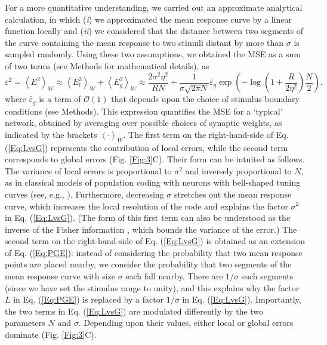 \documentclass[a4paper]{article}%
\begin{document}
For a more quantitative understanding, we carried out an approximate
analytical calculation, in which (\textit{i}) we approximated the mean
response curve by a linear function locally and (\textit{ii}) we considered
that the distance between two segments of the curve containing the mean
response to two stimuli distant by more than $\sigma$ is sampled randomly.
Using these two assumptions, we obtained the MSE as a sum of two terms (see
Methods for mathematical details), as
\begin{equation}
\varepsilon^{2}=\left\langle E^{2}\right\rangle _{W}\approx\left\langle
E_{l}^{2}\right\rangle _{W}+\left\langle E_{g}^{2}\right\rangle _{W}%
\approx\frac{2\sigma^{2}\eta^{2}}{RN}+\frac{1}{\sigma\sqrt{2\pi N}}%
\bar{\varepsilon}_{g}\exp\left(  {-\log}\left(  {1+\frac{R}{2\eta^{2}}%
}\right)  \frac{N}{2}\right)  , \label{Eq:LvsG}%
\end{equation}
where $\bar{\varepsilon}_{g}$ is a term of $\mathcal{O}\left(  1\right)  $
that depends upon the choice of stimulus boundary conditions (see Methods).
This expression quantifies the MSE for a `typical' network, obtained by
averaging over possible choices of synaptic weights, as indicated by the
brackets $\left\langle \cdot\right\rangle _{W}$. The first term on the
right-hand-side of Eq. (\ref{Eq:LvsG}) represents the contribution of local
errors, while the second term corresponds to global errors (Fig.
\ref{Fig:3}C). Their form can be intuited as follows. The variance of local
errors is proportional to $\sigma^{2}$ and inversely proportional to $N$, as
in classical models of population coding with neurons with bell-shaped tuning
curves (see, e.g., \cite{Dayan2001TheoreticalSystems}). Furthermore,
decreasing $\sigma$ stretches out the mean response curve, which increases the
local resolution of the code and explains the factor $\sigma^{2}$ in Eq.
(\ref{Eq:LvsG}). (The form of this first term can also be understood as the
inverse of the Fisher information
\cite{Seung1993SimpleCodes,Brunel1998MutualCoding}, which bounds the variance
of the error.) The second term on the right-hand-side of Eq. (\ref{Eq:LvsG})
is obtained as an extension of Eq. (\ref{Eq:PGE}): instead of considering the
probability that two mean response points are placed nearby, we consider the
probability that two segments of the mean response curve with size $\sigma$
each fall nearby. There are $1/\sigma$ such segments (since we have set the
stimulus range to unity), and this explains why the factor $L$ in Eq.
(\ref{Eq:PGE}) is replaced by a factor $1/\sigma$ in Eq. (\ref{Eq:LvsG}).
Importantly, the two terms in Eq. (\ref{Eq:LvsG}) are modulated differently by
the two parameters $N$ and $\sigma$. Depending upon their values, either local
or global errors dominate (Fig. \ref{Fig:3}C).
\end{document}
